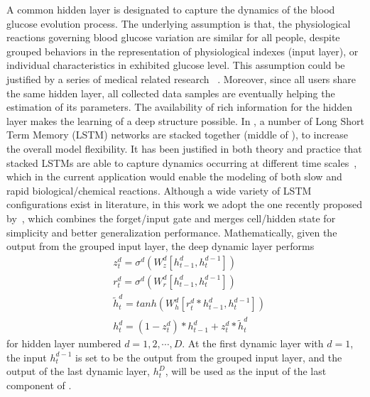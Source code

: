 A common hidden layer is designated to capture the dynamics of the blood glucose evolution process.
The underlying assumption is that, the physiological reactions governing blood glucose variation are similar for all people, despite grouped behaviors in the representation of physiological indexes (input layer), or individual characteristics in exhibited glucose level.
This assumption could be justified by a series of medical related research~\cite{bib:lehmann1992physiological} \cite{bib:TBE07:Dalla} \cite{bib:PE04:Hovorka} \cite{bib:duke2010intelligent}.
Moreover, since all users share the same hidden layer, all collected data samples are eventually helping the estimation of its parameters.
The availability of rich information for the hidden layer makes the learning of a deep structure possible.
In \sysname, a number of Long Short Term Memory (LSTM) networks are stacked together (middle of ), to increase the overall model flexibility.
It has been justified in both theory and practice that stacked LSTMs are able to capture dynamics occurring at different time scales~\cite{dyer2015transition}, which in the current application would enable the modeling of both slow and rapid biological/chemical reactions.
Although a wide variety of LSTM configurations exist in literature, in this work we adopt the one recently proposed by~\cite{koutnik2014clockwork}, which combines the forget/input gate and merges cell/hidden state for simplicity and better generalization performance.
Mathematically, given the output from the grouped input layer, the deep dynamic layer performs
\begin{equation}
\begin{aligned}
&z^d_t = \sigma^d\left( W^d_z [h_{t-1}^d,h_t^{d-1}] \right) \\
&r^d_t = \sigma^d\left( W^d_r [h_{t-1}^d,h_t^{d-1}] \right) \\
&\tilde{h}_t^d = tanh\left( W^d_h [r_t^d*h_{t-1}^d,h_t^{d-1}] \right) \\
&h^d_t = (1-z_t^d)*h_{t-1}^d + z_t^d*\tilde{h}_t^d
\end{aligned}
\end{equation}
for hidden layer numbered $d = 1,2,\cdots,D$. At the first dynamic layer with $d=1$, the input $h_t^{d-1}$ is set to be the output from the grouped input layer, and the output of the last dynamic layer, $h^D_t$, will be used as the input of the last component of \modelname.

